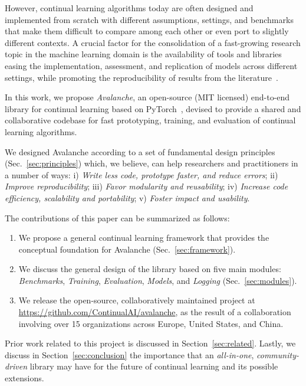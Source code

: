 \documentclass[final]{cvpr}
\theoremstyle{definition}
\begin{document}
However, continual learning algorithms today are often designed and implemented from scratch with different assumptions, settings, and benchmarks that make them difficult to compare among each other or even port to slightly different contexts. A crucial factor for the consolidation of a fast-growing research topic in the machine learning domain is the availability of tools and libraries easing the implementation, assessment, and replication of models across different settings, while promoting the reproducibility of results from the literature~\cite{pineau2020improving}.

In this work, we propose \emph{Avalanche}, an open-source (MIT licensed) end-to-end library for continual learning based on PyTorch~\cite{paszke2019pytorch}, devised to provide a shared and collaborative codebase for fast prototyping, training, and evaluation of continual learning algorithms.

We designed Avalanche according to a set of fundamental design principles (Sec.~\ref{sec:principles}) which, we believe, can help researchers and practitioners in a number of ways: i) \emph{Write less code, prototype faster, and reduce errors}; ii) \emph{Improve reproducibility}; iii) \emph{Favor modularity and reusability}; iv) \emph{Increase code efficiency, scalability and portability}; v) \emph{
Foster impact and usability}.


The contributions of this paper can be summarized as follows:

\begin{enumerate}
    \item We propose a general continual learning framework that provides the conceptual foundation for Avalanche (Sec.~\ref{sec:framework}).
    \item We discuss the general design of the library based on five main modules: \emph{Benchmarks}, \emph{Training}, \emph{Evaluation}, \emph{Models}, and \emph{Logging} (Sec.~\ref{sec:modules}).
    \item We release the open-source, collaboratively maintained project at \url{https://github.com/ContinualAI/avalanche}, as the result of a collaboration involving over 15 organizations across Europe, United States, and China.
\end{enumerate}

Prior work related to this project is discussed in Section~\ref{sec:related}. Lastly, we discuss in Section~\ref{sec:conclusion} the importance that an \emph{all-in-one}, \emph{community-driven} library may have for the future of continual learning and its possible extensions.
\end{document}
